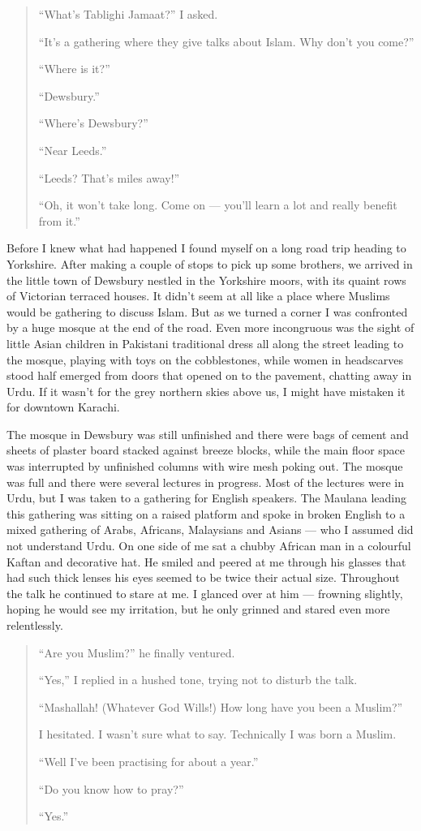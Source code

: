 \documentclass[12pt]{memoir}
\begin{document}
\begin{quote}
“What’s Tablighi Jamaat?” I asked.

“It’s a gathering where they give talks about Islam. Why don’t you come?”

“Where is it?”

“Dewsbury.”

“Where’s Dewsbury?”

“Near Leeds.”

“Leeds? That’s miles away!”

“Oh, it won’t take long.
Come on — you’ll learn a lot and really benefit from it.”
\end{quote}

Before I knew what had happened I found myself
on a long road trip heading to Yorkshire.
After making a couple of stops to pick up some brothers,
we arrived in the little town of Dewsbury nestled in the Yorkshire moors,
with its quaint rows of Victorian terraced houses.
It didn’t seem at all like a place
where Muslims would be gathering to discuss Islam.
But as we turned a corner I was confronted
by a huge mosque at the end of the road.
Even more incongruous was the sight of little Asian children
in Pakistani traditional dress all along the street leading to the mosque,
playing with toys on the cobblestones,
while women in headscarves stood half emerged from doors
that opened on to the pavement, chatting away in Urdu.
If it wasn’t for the grey northern skies above us,
I might have mistaken it for downtown Karachi.

The mosque in Dewsbury was still unfinished and there were bags of cement
and sheets of plaster board stacked against breeze blocks,
while the main floor space was interrupted
by unfinished columns with wire mesh poking out.
The mosque was full and there were several lectures in progress.
Most of the lectures were in Urdu,
but I was taken to a gathering for English speakers.
The Maulana leading this gathering was sitting on a raised platform
and spoke in broken English to a mixed gathering of Arabs,
Africans, Malaysians and Asians — who I assumed did not understand Urdu.
On one side of me sat a chubby African man
in a colourful Kaftan and decorative hat.
He smiled and peered at me through his glasses
that had such thick lenses his eyes seemed to be twice their actual size.
Throughout the talk he continued to stare at me.
I glanced over at him — frowning slightly,
hoping he would see my irritation,
but he only grinned and stared even more relentlessly.

\begin{quote}
“Are you Muslim?” he finally ventured.

“Yes,” I replied in a hushed tone, trying not to disturb the talk.

“Mashallah! (Whatever God Wills!) How long have you been a Muslim?”

I hesitated. I wasn’t sure what to say. Technically I was born a Muslim.

“Well I’ve been practising for about a year.”

“Do you know how to pray?”

“Yes.”
\end{quote}
\end{document}
